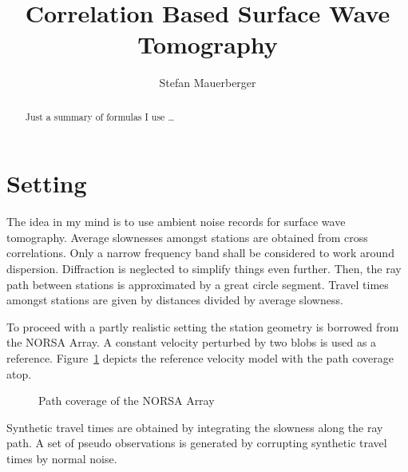 \documentclass[11pt]{article}
\title{Correlation Based Surface Wave Tomography}
\author{Stefan Mauerberger}
\begin{document}
\maketitle
\begin{abstract}
    Just a summary of formulas I use \dots
\end{abstract}

\section{Setting}

The idea in my mind is to use ambient noise records for surface wave tomography.
Average slownesses amongst stations are obtained from cross correlations.
Only a narrow frequency band shall be considered to work around dispersion.
Diffraction is neglected to simplify things even further.
Then, the ray path between stations is approximated by a great circle segment.
Travel times amongst stations are given by distances divided by average slowness.

To proceed with a partly realistic setting the station geometry is borrowed from the NORSA Array.
A constant velocity perturbed by two blobs is used as a reference.
Figure~\ref{fig:path_coverage} depicts the reference velocity model with the path coverage atop.

\begin{figure}
    \centering
    
    \caption{Path coverage of the NORSA Array}
    \label{fig:path_coverage}
\end{figure}

Synthetic travel times are obtained by integrating the slowness along the ray path.
A set of pseudo observations is generated by corrupting synthetic travel times by normal noise.
\end{document}

